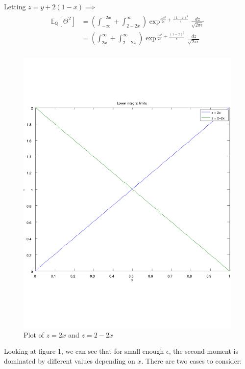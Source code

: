 \documentclass[11pt]{amsart}
\newcommand{\E}{\mathbb{E}}
\begin{document}
Letting $z = y+2(1-x) \implies$
\begin{align}
  \begin{split}
    \E_{\mathbb{Q}}[\Theta^2]
    &= (\int_{-\infty}^{-2x}+\int_{2-2x}^{\infty})
    \exp^{\frac{-z^2}{2\epsilon}+\frac{(1-x)^2}{\epsilon}}
    \frac{dz}{\sqrt{2\pi\epsilon}} \\
    &= (\int_{2x}^{\infty}+\int_{2-2x}^{\infty})
    \exp^{\frac{-z^2}{2\epsilon}+\frac{(1-x)^2}{\epsilon}}
    \frac{dz}{\sqrt{2\pi\epsilon}} \\
  \end{split}
\end{align}
%
%
\begin{figure}[h]
\caption{Plot of $z = 2x$ and $z = 2-2x$}
\includegraphics[scale=0.4]{plot.pdf}
\end{figure}
%
%
Looking at figure 1, we can see that for small enough
$\epsilon$, the second moment is dominated by different
values depending on $x$. There are two cases to consider: 
\\
\end{document}

